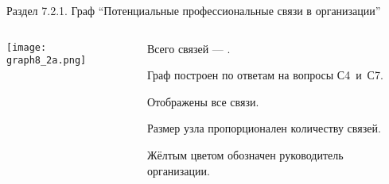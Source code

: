 \begin{frame}{Раздел 7.2.1. Граф ``Потенциальные профессиональные связи в организации''}

\begin{columns}
\begin{column}{0.75\textwidth} 
\centering
          \texttt{[image: graph8\_2a.png]}
\end{column}
\begin{column}{0.25\textwidth} 

\tiny

Всего связей --- \valHBAlinks.
\smallskip

Граф построен по ответам на вопросы С4~и~С7.
\smallskip

\socioSizeComment
\smallskip

Отображены все связи. 
\smallskip

Размер узла пропорционален количеству связей.
\smallskip

Жёлтым цветом обозначен руководитель организации.

\end{column}
\end{columns}
\end{frame}


